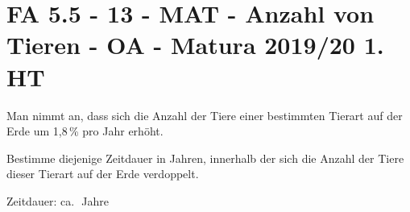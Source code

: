\section{FA 5.5 - 13 - MAT - Anzahl von Tieren - OA - Matura 2019/20 1. HT}

\begin{beispiel}[FA 5.5]{1}
Man nimmt an, dass sich die Anzahl der Tiere einer bestimmten Tierart auf der Erde um 1,8\,\% pro Jahr erhöht.

Bestimme diejenige Zeitdauer in Jahren, innerhalb der sich die Anzahl der Tiere dieser Tierart auf der Erde verdoppelt.\leer

Zeitdauer: ca.\,\,\,\,Jahre
\end{beispiel}
